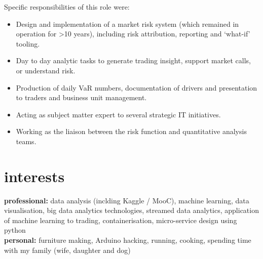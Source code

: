 \documentclass[]{friggeri-cv-a4}
\begin{document}
\begin{entrylist}
{Specific responsibilities of this role were:
\begin{itemize}
	\item Design and implementation of a market risk system (which remained in operation for >10 years), including risk attribution, reporting and ‘what-if’ tooling.
	\item Day to day analytic tasks to generate trading insight, support market calls, or understand risk.
	\item Production of daily VaR numbers, documentation of drivers and presentation to traders and business unit management.
	\item Acting as subject matter expert to several strategic IT initiatives.
	\item Working as the liaison between the risk function and quantitative analysis teams.
\end{itemize}
}


\end{entrylist}



\section{interests}

\textbf{professional:} data analysis (inclding Kaggle / MooC), machine learning, data visualisation, big data analytics technologies, streamed data analytics, application of machine learning to trading, containerisation, micro-service design using python \\

\textbf{personal:} furniture making, Arduino hacking, running, cooking, spending time with my family (wife, daughter and dog)

\end{document}
